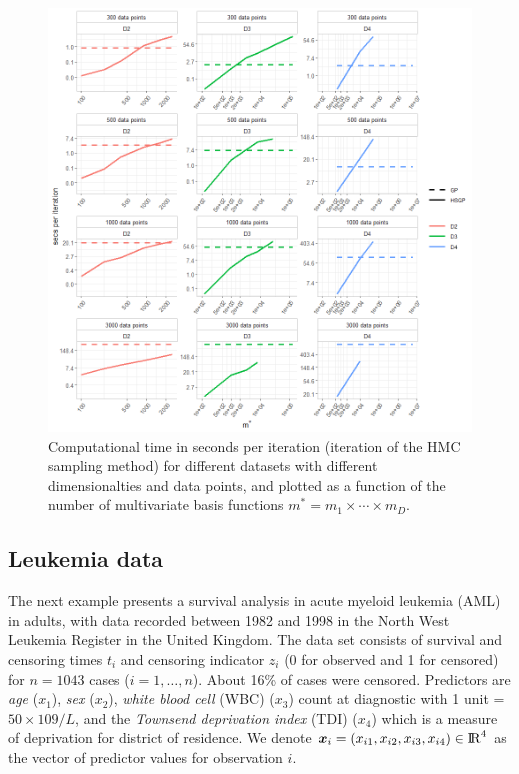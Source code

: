 \begin{figure}
\centering
\includegraphics[width=\textwidth, trim = 0mm 0mm 0mm 0mm, clip]{fig14_time_nD_log.png}
\caption{Computational time in seconds per iteration (iteration of the HMC sampling method) for different datasets with different dimensionalties and data points, and plotted as a function of the number of multivariate basis functions $m^*=m_1\times \cdots \times m_D$.}
  \label{fig14_time_nD_log}
\end{figure}

\subsection{Leukemia data}\label{sec_bf_caseVI}

The next example presents a survival analysis in acute myeloid leukemia (AML) in adults, with data recorded between 1982 and 1998 in the North West Leukemia Register in the United Kingdom. The data set consists of survival and censoring times $t_i$ and censoring indicator $z_i$ (0 for observed and 1 for censored) for $n=1043$ cases ($i=1,\dots,n$). About 16\% of cases were censored. Predictors are \textit{age} ($x_1$), \textit{sex} ($x_2$), \textit{white blood cell} (WBC) ($x_3$) count at diagnostic with 1 unit = $50\times109/L$, and the \textit{Townsend deprivation index} (TDI) ($x_4$) which is a measure of deprivation for district of residence. We denote $\bm{x}_i=(x_{i1},x_{i2},x_{i3},x_{i4}) \in {\rm I\!R}^{4}$ as the vector of predictor values for observation $i$.

